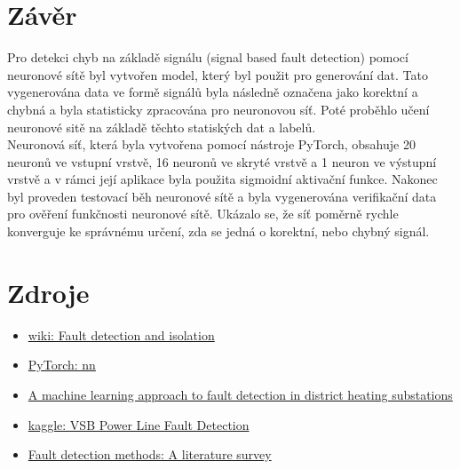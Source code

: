 \documentclass[11pt]{article}
\begin{document}
\hypertarget{zuxe1vux11br}{%
\section{Závěr}\label{zuxe1vux11br}}

Pro detekci chyb na základě signálu (signal based fault detection)
pomocí neuronové sítě byl vytvořen model, který byl použit pro
generování dat. Tato vygenerována data ve formě signálů byla následně
označena jako korektní a chybná a byla statisticky zpracována pro
neuronovou síť. Poté proběhlo učení neuronové sitě na základě těchto
statiských dat a labelů.\\
Neuronová síť, která byla vytvořena pomocí nástroje PyTorch, obsahuje 20
neuronů ve vstupní vrstvě, 16 neuronů ve skryté vrstvě a 1 neuron ve
výstupní vrstvě a v rámci její aplikace byla použita sigmoidní aktivační
funkce. Nakonec byl proveden testovací běh neuronové sítě a byla
vygenerována verifikační data pro ověření funkčnosti neuronové sítě.
Ukázalo se, že síť poměrně rychle konverguje ke správnému určení, zda se
jedná o korektní, nebo chybný signál.

\hypertarget{zdroje}{%
\section{Zdroje}\label{zdroje}}

\begin{itemize}
\tightlist
\item
  \href{https://en.wikipedia.org/wiki/Fault_detection_and_isolation}{wiki:
  Fault detection and isolation}
\item
  \href{https://pytorch.org/tutorials/beginner/pytorch_with_examples.html\#pytorch-nn}{PyTorch:
  nn}
\item
  \href{https://www.sciencedirect.com/science/article/pii/S1876610218304831}{A
  machine learning approach to fault detection in district heating
  substations}
\item
  \href{https://www.kaggle.com/c/vsb-power-line-fault-detection/notebooks}{kaggle:
  VSB Power Line Fault Detection}
\item
  \href{https://www.researchgate.net/publication/221412815_Fault_detection_methods_A_literature_survey/}{Fault
  detection methods: A literature survey}
\end{itemize}
\end{document}
